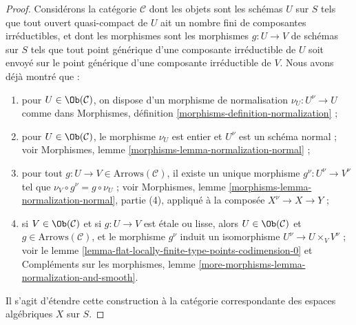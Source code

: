 \begin{proof}
Considérons la catégorie $\mathcal{C}$ dont les objets sont les
schémas $U$ sur $S$ tels que tout ouvert quasi-compact de
$U$ ait un nombre fini de composantes irréductibles, et dont les morphismes
sont les morphismes $g : U \to V$ de schémas sur $S$ tels
que tout point générique d'une composante irréductible de $U$
soit envoyé sur le point générique d'une composante irréductible de $V$.
Nous avons déjà montré que :
\begin{enumerate}
\item[(a)] pour $U \in \Ob(\mathcal{C})$, on dispose d'un
morphisme de normalisation $\nu_U : U^\nu \to U$ comme dans
Morphismes, définition \ref{morphisms-definition-normalization} ;
\item[(b)] pour $U \in \Ob(\mathcal{C})$, le morphisme $\nu_U$
est entier et $U^\nu$ est un schéma normal ; voir
Morphismes, lemme \ref{morphisms-lemma-normalization-normal} ;
\item[(c)] pour tout $g : U \to V \in \text{Arrows}(\mathcal{C})$,
il existe un unique morphisme $g^\nu : U^\nu \to V^\nu$
tel que $\nu_V \circ g^\nu = g \circ \nu_U$ ; voir
Morphismes, lemme \ref{morphisms-lemma-normalization-normal},
partie (4), appliqué à la composée $X^\nu \to X \to Y$ ;
\item[(d)] si $V \in \Ob(\mathcal{C})$ et si $g : U \to V$ est
étale ou lisse, alors $U \in \Ob(\mathcal{C})$ et
$g \in \text{Arrows}(\mathcal{C})$, et le morphisme $g^\nu$
induit un isomorphisme $U^\nu \to U \times_V V^\nu$ ; voir le
lemme \ref{lemma-flat-locally-finite-type-points-codimension-0}
et Compléments sur les morphismes, lemme
\ref{more-morphisms-lemma-normalization-and-smooth}.
\end{enumerate}
Il s'agit d'étendre cette construction à la catégorie correspondante
des espaces algébriques $X$ sur $S$.


\end{proof}
